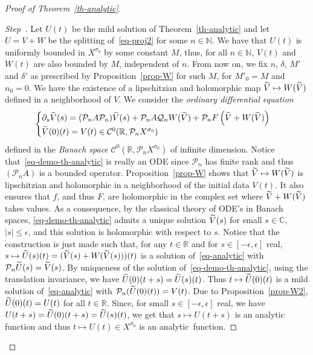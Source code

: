\documentclass[AHL,Unicode,longabstracts]{cedram}
\newcommand{\RR}{\mathbb{R}}
\newcommand{\NN}{\mathbb{N}}
\newcommand{\CC}{\mathbb{C}}
\newcommand{\Cc}{\mathcal{C}}
\newcommand{\Pc}{\mathcal{P}}
\newcommand{\Qc}{\mathcal{Q}}
\newcounter{stepcount}
\newenvironment{step}{\refstepcounter{stepcount}\begin{proof}[Step~\thestepcount]}{\let\qed\relax\end{proof}}
\let\oldtilde\tilde
\renewcommand*{\tilde}[1]{\mathchoice{\widetilde{#1}}{\widetilde{#1}}{\oldtilde{#1}}{\oldtilde{#1}}}\let\oldexists\exists
\renewcommand*{\exists}{\mathrel{\oldexists}}
\begin{document}
\begin{proof}[{Proof of Theorem~\ref{th-analytic}}]
\begin{step}
Let $U(t)$ be the mild solution of Theorem~\ref{th-analytic} and let $U=V+W$ be the splitting of~\eqref{eq-proj2} for some $n\in\NN$. We have that $U(t)$ is uniformly bounded in $X^{\sigma_0}$ by some constant $M$, thus, for all $n\in\NN$, $V(t)$ and $W(t)$ are also bounded by $M$, independent of $n$. From now on, we fix $n$, $\delta$, $M'$ and $\delta'$ as prescribed by Proposition~\ref{prop-W} for such $M$, for $M'_0=M$ and $n_0=0$. We have the existence of a lipschitzian and holomorphic map $\tilde V\mapsto W(\tilde V)$ defined in a neighborhood of $V$. We consider the \emph{ordinary differential equation}
\begin{equation}\label{eq-demo-th-analytic}
\begin{cases}
\partial_s \tilde V(s)=(\Pc_n A \Pc_n) \tilde V(s) + \Pc_n A\Qc_n W(\tilde V) +
\Pc_n F\left(\tilde V+W(\tilde V)\right)\\
\tilde V(0)(t)=V(t) \in\Cc^0(\RR,\Pc_n X^{\sigma_0})
\end{cases}
\end{equation}
defined in the \emph{Banach space} $\Cc^0(\RR,\Pc_n X^{\sigma_0})$ of infinite dimension. Notice that~\eqref{eq-demo-th-analytic} is really an ODE since $\Pc_n$ has finite rank and thus $(\Pc_n A)$ is a bounded operator. Proposition~\ref{prop-W} shows that $\tilde V\mapsto W(\tilde V)$ is lipschitzian and holomorphic in a neighborhood of the initial data $V(t)$. It also ensures that $f$, and thus $F$, are holomorphic in the complex set where $\tilde V+W(\tilde V)$ takes values. As a consequence, by the classical theory of ODE's in Banach spaces, \eqref{eq-demo-th-analytic} admits a unique solution $\tilde V(s)$ for small $s\in \CC$, $|s|\leq \epsilon$, and this solution is holomorphic with respect to $s$. Notice that the construction is just made such that, for any $t\in\RR$ and for $s\in[-\epsilon,\epsilon]$ real, $s\mapsto\tilde U(s)(t)=(\tilde V(s)+W(\tilde V(s)))(t)$ is a solution of~\eqref{eq-analytic} with $\Pc_n \tilde U(s)=\tilde V(s)$. By uniqueness of the solution of~\eqref{eq-demo-th-analytic}, using the translation invariance, we have $\tilde U(0)(t+s)=\tilde U(s)(t)$. Thus $t\mapsto\tilde U(0)(t)$ is a mild solution of~\eqref{eq-analytic} with $\Pc_n (\tilde U(0)(t))=V(t)$. Due to Proposition~\ref{prop-W2}, $\tilde U(0)(t)=U(t)$ for all $t\in\RR$. Since, for small $s\in[-\epsilon,\epsilon]$ real, we have $U(t+s)=\tilde U(0)(t+s)=\tilde U(s)(t)$, we get that $s\mapsto U(t+s)$ is an analytic function and thus $t\mapsto U(t)\in X^{\sigma_0}$ is an analytic~function.\qedhere 
\end{step}\let\qed\relax
\end{proof}
\end{document}
